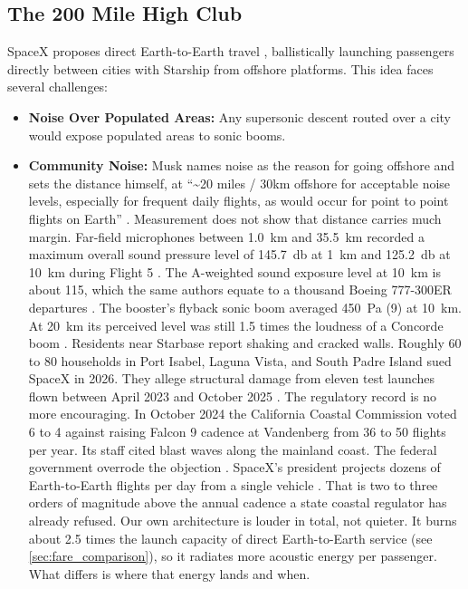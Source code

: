 \documentclass{article}
\begin{document}
\subsection{The 200 Mile High Club} \label{sec:200_mile_high}
SpaceX proposes direct Earth-to-Earth travel \cite{earth_to_earth}, ballistically launching passengers directly between cities with Starship from offshore platforms. This idea faces several challenges:
\begin{itemize}
\item \textbf{Noise Over Populated Areas:} Any supersonic descent routed over a city would expose populated areas to sonic booms.
\item \textbf{Community Noise:} Musk names noise as the reason for going offshore and sets the distance himself, at ``\textasciitilde20 miles / 30km offshore for acceptable noise levels, especially for frequent daily flights, as would occur for point to point flights on Earth'' \cite{musk_offshore_noise, futurism_musk_offshore}. Measurement does not show that distance carries much margin. Far-field microphones between \SI{1.0}{\kilo\meter} and \SI{35.5}{\kilo\meter} recorded a maximum overall sound pressure level of \SI{145.7}{\decibel} at \SI{1}{\kilo\meter} and \SI{125.2}{\decibel} at \SI{10}{\kilo\meter} during Flight 5 \cite{gee2024starship, gee2025starship_acoustics}. The A-weighted sound exposure level at \SI{10}{\kilo\meter} is about \SI{115}{\dBA}, which the same authors equate to a thousand Boeing 777-300ER departures \cite{gee2025starship_acoustics}. The booster's flyback sonic boom averaged \SI{450}{\pascal} (\SI{9}{\psf}) at \SI{10}{\kilo\meter}. At \SI{20}{\kilo\meter} its perceived level was still 1.5 times the loudness of a Concorde boom \cite{gee2025starship_acoustics}. Residents near Starbase report shaking and cracked walls. Roughly 60 to 80 households in Port Isabel, Laguna Vista, and South Padre Island sued SpaceX in 2026. They allege structural damage from eleven test launches flown between April 2023 and October 2025 \cite{texas_tribune_spacex_suit}. The regulatory record is no more encouraging. In October 2024 the California Coastal Commission voted 6 to 4 against raising Falcon 9 cadence at Vandenberg from 36 to 50 flights per year. Its staff cited blast waves along the mainland coast. The federal government overrode the objection \cite{ccc_vandenberg_2024}. SpaceX's president projects dozens of Earth-to-Earth flights per day from a single vehicle \cite{shotwell_ted_2018}. That is two to three orders of magnitude above the annual cadence a state coastal regulator has already refused. Our own architecture is louder in total, not quieter. It burns about 2.5 times the launch capacity of direct Earth-to-Earth service (see \autoref{sec:fare_comparison}), so it radiates more acoustic energy per passenger. What differs is where that energy lands and when.

\end{itemize}
\end{document}
